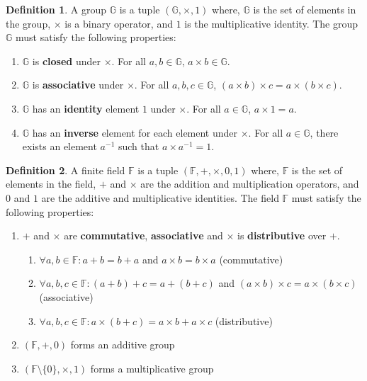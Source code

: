 \documentclass[11pt]{report}
\theoremstyle{definition}
\newtheorem{definition}{Definition}[section]
\theoremstyle{plain}
\begin{document}
\begin{definition}\label{def:group}
  A group $\mathbb{G}$ is a tuple $(\mathbb{G}, \times, 1)$ where, $\mathbb{G}$ is the set of elements in the group, $\times$ is a binary operator, and $1$ is the multiplicative identity. The group $\mathbb{G}$ must satisfy the following properties:
  \begin{enumerate}
    \item $\mathbb{G}$ is \textbf{closed} under $\times$. For all $a,b \in \mathbb{G}$, $a \times b \in \mathbb{G}$.
    \item $\mathbb{G}$ is \textbf{associative} under $\times$. For all $a,b,c \in \mathbb{G}$, $(a \times b) \times c = a \times (b \times c)$.
    \item $\mathbb{G}$ has an \textbf{identity} element $1$ under $\times$. For all $a \in \mathbb{G}$, $a \times 1 = a$.
    \item $\mathbb{G}$ has an \textbf{inverse} element for each element under $\times$. For all $a \in \mathbb{G}$, there exists an element $a^{-1}$ such that $a \times a^{-1} = 1$.
  \end{enumerate}
\end{definition}

\begin{definition}\label{def:field}
  A finite field $\mathbb{F}$ is a tuple $(\mathbb{F}, +, \times, 0, 1)$ where, $\mathbb{F}$ is the set of elements in the field, $+$ and $\times$ are the addition and multiplication operators, and $0$ and $1$ are the additive and multiplicative identities. The field $\mathbb{F}$ must satisfy the following properties:
  \begin{enumerate}
    \item  $+$ and $\times$ are \textbf{commutative}, \textbf{associative} and $\times$ is \textbf{distributive} over $+$.
          \begin{enumerate}
            \item $\forall a,b \in \mathbb{F}: a + b = b + a$ and $a \times b = b \times a$ (commutative)
            \item $\forall a,b,c \in \mathbb{F}: (a + b) + c = a + (b + c)$ and $(a \times b) \times c = a \times (b \times c)$ (associative)
            \item $\forall a,b,c \in \mathbb{F}: a \times (b + c) = a \times b + a \times c$ (distributive)
          \end{enumerate}
    \item $(\mathbb{F}, +, 0)$ forms an additive group
    \item $(\mathbb{F} \setminus \{0\}, \times, 1)$ forms a multiplicative group
  \end{enumerate}
\end{definition}
\end{document}
